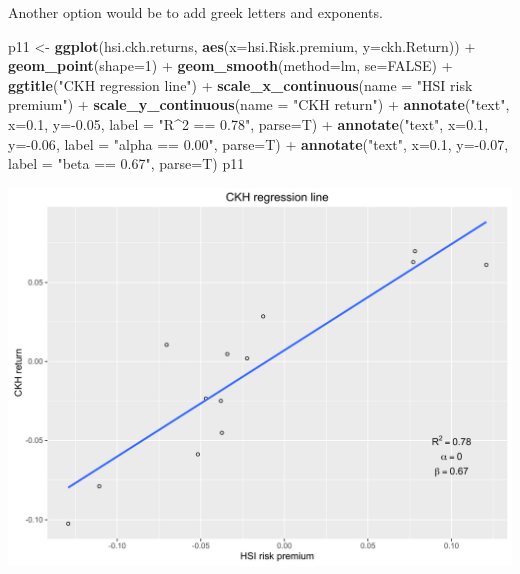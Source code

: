 \documentclass[]{article}
\newenvironment{Shaded}{\begin{snugshade}}{\end{snugshade}}
\newcommand{\KeywordTok}[1]{\textcolor[rgb]{0.13,0.29,0.53}{\textbf{{#1}}}}
\newcommand{\DataTypeTok}[1]{\textcolor[rgb]{0.13,0.29,0.53}{{#1}}}
\newcommand{\DecValTok}[1]{\textcolor[rgb]{0.00,0.00,0.81}{{#1}}}
\newcommand{\FloatTok}[1]{\textcolor[rgb]{0.00,0.00,0.81}{{#1}}}
\newcommand{\StringTok}[1]{\textcolor[rgb]{0.31,0.60,0.02}{{#1}}}
\newcommand{\OtherTok}[1]{\textcolor[rgb]{0.56,0.35,0.01}{{#1}}}
\newcommand{\NormalTok}[1]{{#1}}
\begin{document}
Another option would be to add greek letters and exponents.

\begin{Shaded}
\begin{Highlighting}[]
\NormalTok{p11 <-}\StringTok{ }\KeywordTok{ggplot}\NormalTok{(hsi.ckh.returns, }\KeywordTok{aes}\NormalTok{(}\DataTypeTok{x=}\NormalTok{hsi.Risk.premium, }\DataTypeTok{y=}\NormalTok{ckh.Return)) +}\StringTok{ }\KeywordTok{geom_point}\NormalTok{(}\DataTypeTok{shape=}\DecValTok{1}\NormalTok{) +}\StringTok{ }
\StringTok{      }\KeywordTok{geom_smooth}\NormalTok{(}\DataTypeTok{method=}\NormalTok{lm, }\DataTypeTok{se=}\OtherTok{FALSE}\NormalTok{) +}\StringTok{ }\KeywordTok{ggtitle}\NormalTok{(}\StringTok{"CKH regression line"}\NormalTok{) +}
\StringTok{      }\KeywordTok{scale_x_continuous}\NormalTok{(}\DataTypeTok{name =} \StringTok{"HSI risk premium"}\NormalTok{) +}
\StringTok{      }\KeywordTok{scale_y_continuous}\NormalTok{(}\DataTypeTok{name =} \StringTok{"CKH return"}\NormalTok{) +}\StringTok{ }
\StringTok{      }\KeywordTok{annotate}\NormalTok{(}\StringTok{"text"}\NormalTok{, }\DataTypeTok{x=}\FloatTok{0.1}\NormalTok{, }\DataTypeTok{y=}\NormalTok{-}\FloatTok{0.05}\NormalTok{, }\DataTypeTok{label =} \StringTok{"R^2 == 0.78"}\NormalTok{, }\DataTypeTok{parse=}\NormalTok{T) +}\StringTok{ }
\StringTok{      }\KeywordTok{annotate}\NormalTok{(}\StringTok{"text"}\NormalTok{, }\DataTypeTok{x=}\FloatTok{0.1}\NormalTok{, }\DataTypeTok{y=}\NormalTok{-}\FloatTok{0.06}\NormalTok{, }\DataTypeTok{label =} \StringTok{"alpha == 0.00"}\NormalTok{, }\DataTypeTok{parse=}\NormalTok{T) +}\StringTok{ }
\StringTok{      }\KeywordTok{annotate}\NormalTok{(}\StringTok{"text"}\NormalTok{, }\DataTypeTok{x=}\FloatTok{0.1}\NormalTok{, }\DataTypeTok{y=}\NormalTok{-}\FloatTok{0.07}\NormalTok{, }\DataTypeTok{label =} \StringTok{"beta == 0.67"}\NormalTok{, }\DataTypeTok{parse=}\NormalTok{T)}
\NormalTok{p11}
\end{Highlighting}
\end{Shaded}

\begin{center}\includegraphics{0_all_posts_pdf/lr_11-1} \end{center}
\end{document}
